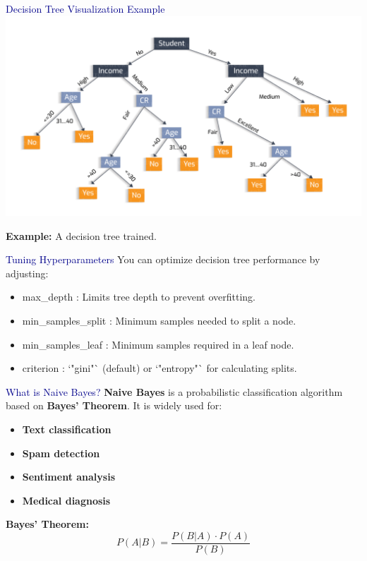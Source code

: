\begin{frame}{\textcolor{darkblue}{Decision Tree Visualization Example}}
    \centering
    \includegraphics[width=0.75\linewidth]{Sections/TP3/Images/decision_tree.png}

    \medskip
    \textbf{Example:} A decision tree trained.
\end{frame}

\begin{frame}{\textcolor{darkblue}{Tuning Hyperparameters}}
    You can optimize decision tree performance by adjusting:
    \begin{itemize}
        \item max\_depth : Limits tree depth to prevent overfitting.
        \item min\_samples\_split : Minimum samples needed to split a node.
        \item min\_samples\_leaf : Minimum samples required in a leaf node.
        \item criterion : `"gini"` (default) or `"entropy"` for calculating splits.
    \end{itemize}
\end{frame}

\begin{frame}{\textcolor{darkblue}{What is Naive Bayes?}}
    \textbf{Naive Bayes} is a probabilistic classification algorithm based on \textbf{Bayes' Theorem}.  
    It is widely used for:
    \begin{itemize}
        \item \textbf{Text classification}
        \item \textbf{Spam detection}
        \item \textbf{Sentiment analysis}
        \item \textbf{Medical diagnosis}
    \end{itemize}

    \vspace{0.4cm}
    \textbf{Bayes' Theorem:}
    \[
    P(A|B) = \frac{P(B|A) \cdot P(A)}{P(B)}
    \]
\end{frame}


